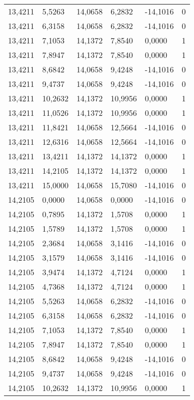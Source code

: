 \begin{longtable}{@{}llllll@{}}
		13,4211 & 5,5263  & 14,0658 & 6,2832  & -14,1016 & 0  \\
		13,4211 & 6,3158  & 14,0658 & 6,2832  & -14,1016 & 0  \\
		13,4211 & 7,1053  & 14,1372 & 7,8540  & 0,0000   & 1  \\
		13,4211 & 7,8947  & 14,1372 & 7,8540  & 0,0000   & 1  \\
		13,4211 & 8,6842  & 14,0658 & 9,4248  & -14,1016 & 0  \\
		13,4211 & 9,4737  & 14,0658 & 9,4248  & -14,1016 & 0  \\
		13,4211 & 10,2632 & 14,1372 & 10,9956 & 0,0000   & 1  \\
		13,4211 & 11,0526 & 14,1372 & 10,9956 & 0,0000   & 1  \\
		13,4211 & 11,8421 & 14,0658 & 12,5664 & -14,1016 & 0  \\
		13,4211 & 12,6316 & 14,0658 & 12,5664 & -14,1016 & 0  \\
		13,4211 & 13,4211 & 14,1372 & 14,1372 & 0,0000   & 1  \\
		13,4211 & 14,2105 & 14,1372 & 14,1372 & 0,0000   & 1  \\
		13,4211 & 15,0000 & 14,0658 & 15,7080 & -14,1016 & 0  \\
		14,2105 & 0,0000  & 14,0658 & 0,0000  & -14,1016 & 0  \\
		14,2105 & 0,7895  & 14,1372 & 1,5708  & 0,0000   & 1  \\
		14,2105 & 1,5789  & 14,1372 & 1,5708  & 0,0000   & 1  \\
		14,2105 & 2,3684  & 14,0658 & 3,1416  & -14,1016 & 0  \\
		14,2105 & 3,1579  & 14,0658 & 3,1416  & -14,1016 & 0  \\
		14,2105 & 3,9474  & 14,1372 & 4,7124  & 0,0000   & 1  \\
		14,2105 & 4,7368  & 14,1372 & 4,7124  & 0,0000   & 1  \\
		14,2105 & 5,5263  & 14,0658 & 6,2832  & -14,1016 & 0  \\
		14,2105 & 6,3158  & 14,0658 & 6,2832  & -14,1016 & 0  \\
		14,2105 & 7,1053  & 14,1372 & 7,8540  & 0,0000   & 1  \\
		14,2105 & 7,8947  & 14,1372 & 7,8540  & 0,0000   & 1  \\
		14,2105 & 8,6842  & 14,0658 & 9,4248  & -14,1016 & 0  \\
		14,2105 & 9,4737  & 14,0658 & 9,4248  & -14,1016 & 0  \\
		14,2105 & 10,2632 & 14,1372 & 10,9956 & 0,0000   & 1  \\

\end{longtable}
